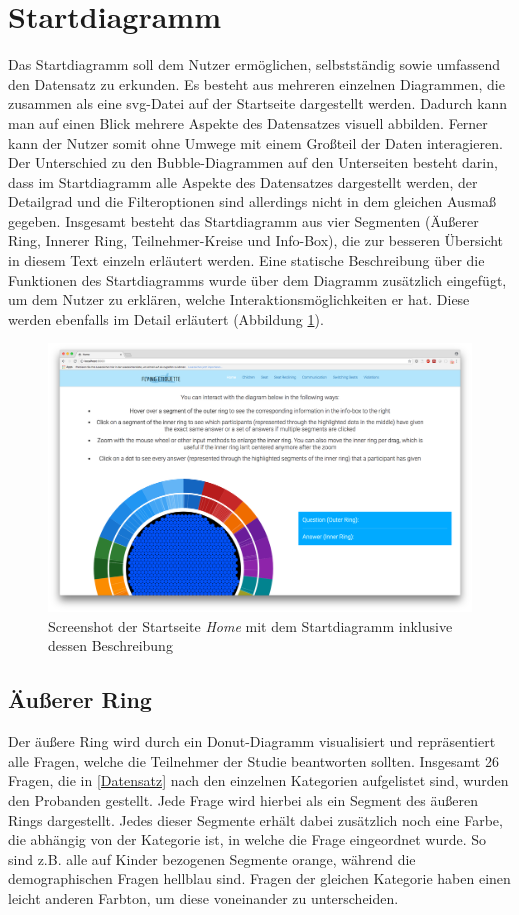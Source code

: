 \documentclass{mi-seminar}
\begin{document}
\section{Startdiagramm}
Das Startdiagramm soll dem Nutzer ermöglichen, selbstständig sowie umfassend den Datensatz zu erkunden. Es besteht aus mehreren einzelnen Diagrammen, die zusammen als eine svg-Datei auf der Startseite dargestellt werden. Dadurch kann man auf einen Blick mehrere Aspekte des Datensatzes visuell abbilden. Ferner kann der Nutzer somit ohne Umwege mit einem Großteil der Daten interagieren. Der Unterschied zu den Bubble-Diagrammen auf den Unterseiten besteht darin, dass im Startdiagramm alle Aspekte des Datensatzes dargestellt werden, der Detailgrad und die Filteroptionen sind allerdings nicht in dem gleichen Ausmaß gegeben. Insgesamt besteht das Startdiagramm aus vier Segmenten (Äußerer Ring, Innerer Ring, Teilnehmer-Kreise und Info-Box), die zur besseren Übersicht in diesem Text einzeln erläutert werden. Eine statische Beschreibung über die Funktionen des Startdiagramms wurde über dem Diagramm zusätzlich eingefügt, um dem Nutzer zu erklären, welche Interaktionsmöglichkeiten er hat. Diese werden ebenfalls im Detail erläutert (Abbildung \ref{ScStartDiagram}).
\begin{figure}
\includegraphics[scale=0.3]{assets/start_startpage.png}
\caption{Screenshot der Startseite \textit{Home} mit dem Startdiagramm inklusive dessen Beschreibung}
\label{ScStartDiagram}
\end{figure}

\subsection{Äußerer Ring}
Der äußere Ring wird durch ein Donut-Diagramm visualisiert und repräsentiert alle Fragen, welche die Teilnehmer der Studie beantworten sollten. Insgesamt 26 Fragen, die in \ref{Datensatz} nach den einzelnen Kategorien aufgelistet sind, wurden den Probanden gestellt. Jede Frage wird hierbei als ein Segment des äußeren Rings dargestellt. Jedes dieser Segmente erhält dabei zusätzlich noch eine Farbe, die abhängig von der Kategorie ist, in welche die Frage eingeordnet wurde. So sind z.B. alle auf Kinder bezogenen Segmente orange, während die demographischen Fragen hellblau sind. Fragen der gleichen Kategorie haben einen leicht anderen Farbton, um diese voneinander zu unterscheiden. 
\end{document}
